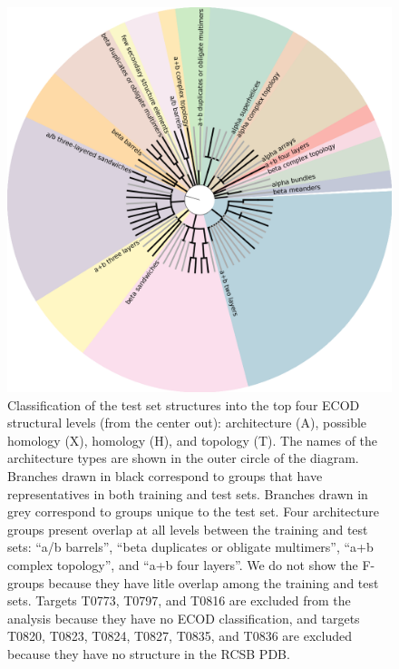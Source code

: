 \documentclass[letter,10pt]{article}
\begin{document}
\begin{figure}[H]
    \centering
    \includegraphics[width=\linewidth]{Fig/folds_graph.png}
%
    \caption{Classification of the test set structures into the top
      four ECOD structural levels (from the center out): architecture
      (A), possible homology (X), homology (H), and topology (T). The
      names of the architecture types are shown in the outer circle of
      the diagram. Branches drawn in black correspond to groups that
      have representatives in both training and test sets. Branches
      drawn in grey correspond to groups unique to the test set.
%
      Four architecture groups present overlap at all levels between
      the training and test sets: ``a/b barrels'', ``beta duplicates
      or obligate multimers'', ``a+b complex topology'', and ``a+b
      four layers''.
%
      We do not show the F-groups because they have litle overlap
      among the training and test sets.
%
      Targets T0773, T0797, and T0816 are excluded from the analysis
      because they have no ECOD classification, and targets T0820,
      T0823, T0824, T0827, T0835, and T0836 are excluded because they
      have no structure in the RCSB PDB.}
%
    \label{Fig:foldsGraph}
\end{figure}
\end{document}

